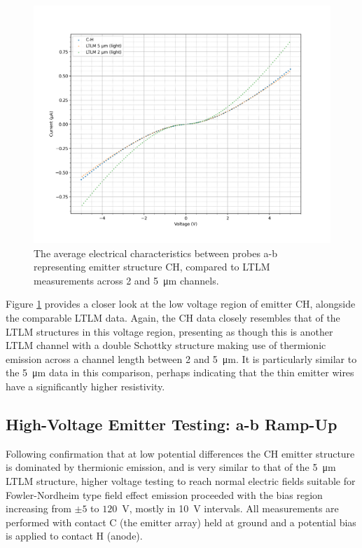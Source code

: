 \begin{refsection}
\begin{figure}[H]
    \centering
    \includegraphics[width=\linewidth]{Chapter7/Figs/Raster/Emitters/5V comparison to LTLM.png}
    \caption{The average electrical characteristics between probes a-b representing emitter structure CH, compared to LTLM measurements across 2 and 5~\si{\micro\metre} channels.}
    \label{fig:e_ch_5v_ltlm}
\end{figure}

Figure \ref{fig:e_ch_5v_ltlm} provides a closer look at the low voltage region of emitter CH, alongside the comparable LTLM data. Again, the CH data closely resembles that of the LTLM structures in this voltage region, presenting as though this is another LTLM channel with a double Schottky structure making use of thermionic emission across a channel length between 2 and 5~\si{\micro\metre}. It is particularly similar to the 5~\si{\micro\metre} data in this comparison, perhaps indicating that the thin emitter wires have a significantly higher resistivity.

\subsection{High-Voltage Emitter Testing: a-b Ramp-Up}
Following confirmation that at low potential differences the CH emitter structure is dominated by thermionic emission, and is very similar to that of the 5~\si{\micro\metre} LTLM structure, higher voltage testing to reach normal electric fields suitable for Fowler-Nordheim type field effect emission proceeded with the bias region increasing from $\pm5$ to $120$~\si{\volt}, mostly in 10~\si{\volt} intervals. All measurements are performed with contact C (the emitter array) held at ground and a potential bias is applied to contact H (anode).


\end{refsection}
